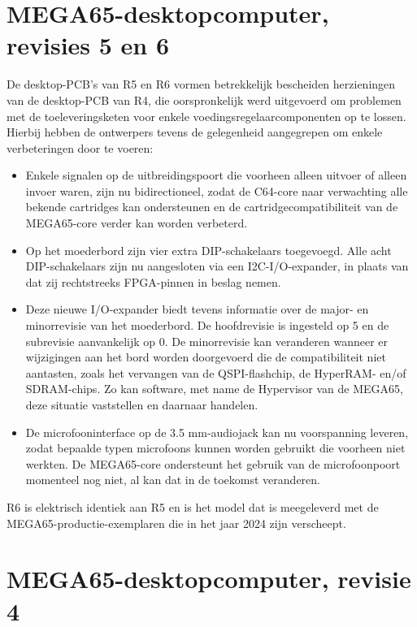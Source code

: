 \section{MEGA65-desktopcomputer, revisies 5 en 6}

De desktop-PCB's van R5 en R6 vormen betrekkelijk bescheiden herzieningen van de desktop-PCB van R4, die oorspronkelijk werd uitgevoerd om problemen met de toeleveringsketen voor enkele voedingsregelaarcomponenten op te lossen. Hierbij hebben de ontwerpers tevens de gelegenheid aangegrepen om enkele verbeteringen door te voeren:

\begin{itemize}
\item Enkele signalen op de uitbreidingspoort die voorheen alleen uitvoer of alleen invoer waren, zijn nu bidirectioneel, zodat de C64-core naar verwachting alle bekende cartridges kan ondersteunen en de cartridgecompatibiliteit van de MEGA65-core verder kan worden verbeterd.\item Op het moederbord zijn vier extra DIP-schakelaars toegevoegd. Alle acht DIP-schakelaars zijn nu aangesloten via een I2C-I/O-expander, in plaats van dat zij rechtstreeks FPGA-pinnen in beslag nemen.\item Deze nieuwe I/O-expander biedt tevens informatie over de major- en minorrevisie van het moederbord. De hoofdrevisie is ingesteld op 5 en de subrevisie aanvankelijk op 0. De minorrevisie kan veranderen wanneer er wijzigingen aan het bord worden doorgevoerd die de compatibiliteit niet aantasten, zoals het vervangen van de QSPI-flashchip, de HyperRAM- en/of SDRAM-chips. Zo kan software, met name de Hypervisor van de MEGA65, deze situatie vaststellen en daarnaar handelen.\item De microfooninterface op de 3.5 mm-audiojack kan nu voorspanning leveren, zodat bepaalde typen microfoons kunnen worden gebruikt die voorheen niet werkten. De MEGA65-core ondersteunt het gebruik van de microfoonpoort momenteel nog niet, al kan dat in de toekomst veranderen.

\end{itemize}

R6 is elektrisch identiek aan R5 en is het model dat is meegeleverd met de MEGA65-productie-exemplaren die in het jaar 2024 zijn verscheept.

\section{MEGA65-desktopcomputer, revisie 4}

